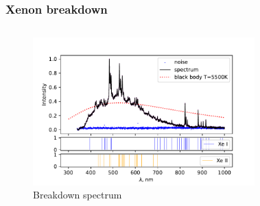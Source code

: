 \documentclass{beamer}
\begin{document}
	\begin{frame}
		\frametitle{Xenon breakdown}
		\begin{columns}
			\begin{figure}
				\centering
				\includegraphics[width=1.1\linewidth]{gen/xe_lines.pdf}
				\caption*{Breakdown spectrum}
			\end{figure}	
			\begin{figure}
				\centering

\end{figure}
\end{columns}
\end{frame}
\end{document}
